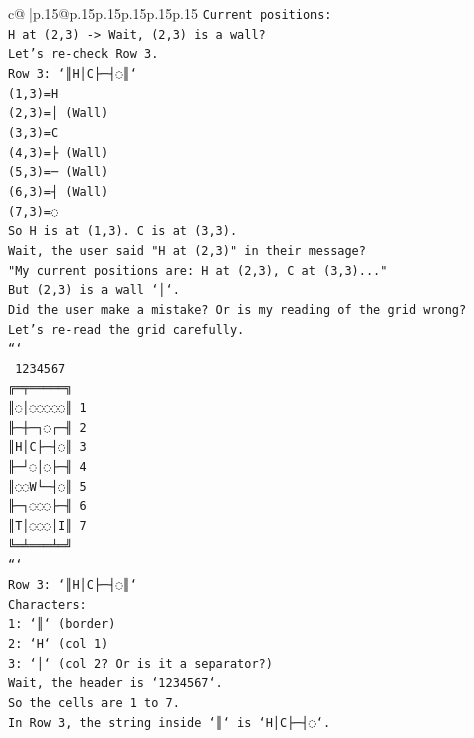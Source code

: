 \documentclass{article}
\begin{document}
{\begin{supertabular}{c@{$\;$}|p{.15\linewidth}@{}p{.15\linewidth}p{.15\linewidth}p{.15\linewidth}p{.15\linewidth}p{.15\linewidth}}
{{{\texttt{Current positions:} \\
\texttt{H at (2,3) {-}> Wait, (2,3) is a wall?} \\
\texttt{Let's re{-}check Row 3.} \\
\texttt{Row 3: `║H│C├─┤◌║`} \\
\texttt{(1,3)=H} \\
\texttt{(2,3)=│ (Wall)} \\
\texttt{(3,3)=C} \\
\texttt{(4,3)=├ (Wall)} \\
\texttt{(5,3)=─ (Wall)} \\
\texttt{(6,3)=┤ (Wall)} \\
\texttt{(7,3)=◌} \\
\texttt{So H is at (1,3). C is at (3,3).} \\
\texttt{Wait, the user said "H at (2,3)" in their message?} \\
\texttt{"My current positions are: H at (2,3), C at (3,3)..."} \\
\texttt{But (2,3) is a wall `│`.} \\
\texttt{Did the user make a mistake? Or is my reading of the grid wrong?} \\
\texttt{Let's re{-}read the grid carefully.} \\
\texttt{```} \\
\texttt{ 1234567} \\
\texttt{╔═╤═════╗} \\
\texttt{║◌│◌◌◌◌◌║ 1} \\
\texttt{╟─┼─┐◌┌─╢ 2} \\
\texttt{║H│C├─┤◌║ 3} \\
\texttt{╟─┘◌│◌├─╢ 4} \\
\texttt{║◌◌W└─┤◌║ 5} \\
\texttt{╟─┐◌◌◌├─╢ 6} \\
\texttt{║T│◌◌◌│I║ 7} \\
\texttt{╚═╧═══╧═╝} \\
\texttt{```} \\
\texttt{Row 3: `║H│C├─┤◌║`} \\
\texttt{Characters:} \\
\texttt{1: `║` (border)} \\
\texttt{2: `H` (col 1)} \\
\texttt{3: `│` (col 2? Or is it a separator?)} \\
\texttt{Wait, the header is `1234567`.} \\
\texttt{So the cells are 1 to 7.} \\
\texttt{In Row 3, the string inside `║` is `H│C├─┤◌`.} \\
}}}
\end{supertabular}}
\end{document}
